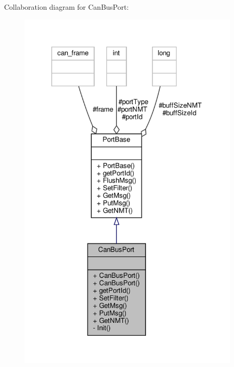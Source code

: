 Collaboration diagram for Can\+Bus\+Port\+:\nopagebreak
\begin{figure}[H]
\begin{center}
\leavevmode
\includegraphics[width=301pt]{classCanBusPort__coll__graph}
\end{center}
\end{figure}
